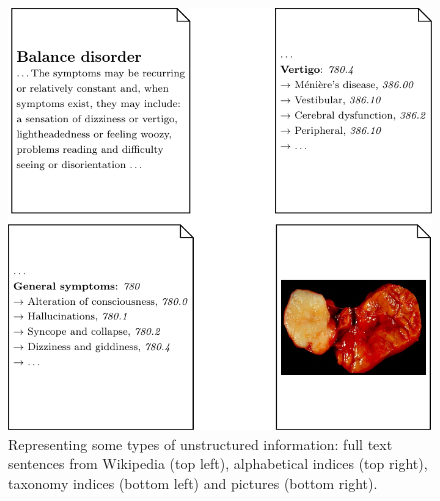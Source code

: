 \begin{figure}
	\centering
	\includegraphics[scale=0.7]{fig/01dataint/foldedfulltext}
	\caption{Representing some types of unstructured information: full text sentences from Wikipedia (top left), alphabetical indices (top right), taxonomy indices (bottom left) and pictures (bottom right).}
	\label{fig:unstructuredmedical}
\end{figure}

